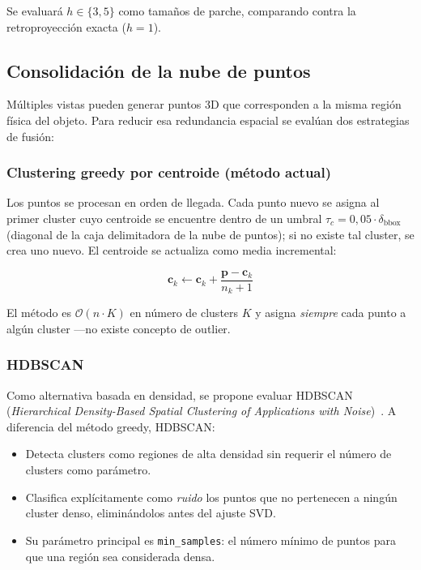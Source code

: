 Se evaluará $h \in \{3, 5\}$ como tamaños de parche, comparando contra la
retroproyección exacta ($h=1$).

\subsection{Consolidación de la nube de puntos}
\label{sec:clustering}

Múltiples vistas pueden generar puntos 3D que corresponden a la misma región
física del objeto. Para reducir esa redundancia espacial se evalúan dos
estrategias de fusión:

\subsubsection{Clustering greedy por centroide (método actual)}

Los puntos se procesan en orden de llegada. Cada punto nuevo se asigna al primer
cluster cuyo centroide se encuentre dentro de un umbral $\tau_c = 0{,}05 \cdot
\delta_{\text{bbox}}$ (diagonal de la caja delimitadora de la nube de puntos);
si no existe tal cluster, se crea uno nuevo. El centroide se actualiza como media
incremental:

\begin{equation}
    \mathbf{c}_k \leftarrow \mathbf{c}_k +
    \frac{\mathbf{p} - \mathbf{c}_k}{n_k + 1}
\end{equation}

El método es $\mathcal{O}(n \cdot K)$ en número de clusters $K$ y asigna
\textit{siempre} cada punto a algún cluster —no existe concepto de outlier.

\subsubsection{HDBSCAN}

Como alternativa basada en densidad, se propone evaluar HDBSCAN
(\textit{Hierarchical Density-Based Spatial Clustering of Applications with
Noise})~\cite{campello2013hdbscan}. A diferencia del método greedy, HDBSCAN:

\begin{itemize}
    \item Detecta clusters como regiones de alta densidad sin requerir el número
          de clusters como parámetro.
    \item Clasifica explícitamente como \textit{ruido} los puntos que no
          pertenecen a ningún cluster denso, eliminándolos antes del ajuste SVD.
    \item Su parámetro principal es \texttt{min\_samples}: el número mínimo de
          puntos para que una región sea considerada densa.
\end{itemize}

